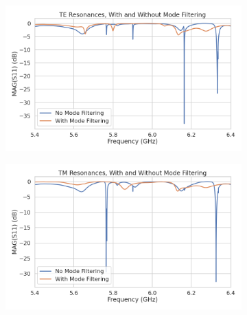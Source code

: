 \begin{figure}[htbp]
    \centering
    \begin{subfigure}{0.67\textwidth}
        \includegraphics*[width=\textwidth]{figs/Chapter-6/220601_TE_resonance_filtering.png}
        \caption{}
    \end{subfigure}
    \hfill
    \begin{subfigure}{0.67\textwidth}
        \includegraphics*[width=\textwidth]{figs/Chapter-6/220505_TM_resonance_filtering.png}
        \caption{}
    \end{subfigure}
    \caption{}    
\end{figure}

